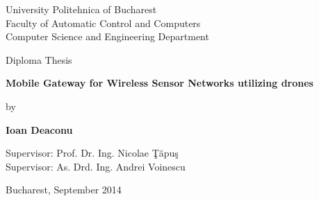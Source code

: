 

\pagestyle{empty}
\sffamily

\noindent
\begin{center}
    \Large
    University Politehnica of Bucharest\\
    Faculty of Automatic Control and Computers \\
    Computer Science and Engineering Department \\
\end{center}

\vfill\vfill
\begin{center}
    \Large
    Diploma Thesis\\
\end{center}

\vfill
\begin{center}
	\HUGE\bfseries
	Mobile Gateway for Wireless Sensor Networks utilizing drones\\
\vfill
	\large
	
\end{center}

\vfill
\begin{center}
    \Large
    by
\end{center}

\vfill
\begin{center}
    \huge\bfseries
    Ioan Deaconu
\end{center}

\vfill\vfill\vfill
\begin{center}
	\Large
	Supervisor: Prof. Dr. Ing. Nicolae \c{T}\u{a}pu\c{s}\\
	Supervisor: As. Drd. Ing. Andrei Voinescu
\end{center}

\vfill
\begin{center}
\large
    Bucharest, September 2014
\end{center}

\cleardoublepage

\pagestyle{headings}
\tableofcontents

